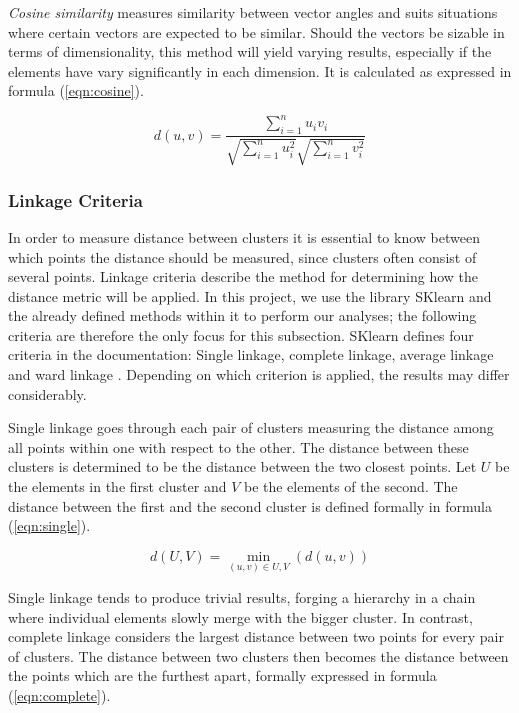 \textit{Cosine similarity} measures similarity between vector angles and suits situations where certain vectors are expected to be similar. Should the vectors be sizable in terms of dimensionality, this method will yield varying results, especially if the elements have vary significantly in each dimension. It is calculated as expressed in formula (\ref{eqn:cosine}).

\begin{equation}
\label{eqn:cosine}
d(u, v) = \frac{\sum_{i=1}^n u_iv_i}{\sqrt{\sum_{i=1}^n u_i^2}\sqrt{\sum_{i=1}^n v_i^2}}
\end{equation}

\subsubsection{Linkage Criteria}
In order to measure distance between clusters it is essential to know between which points the distance should be measured, since clusters often consist of several points. Linkage criteria describe the method for determining how the distance metric will be applied. In this project, we use the library SKlearn and the already defined methods within it to perform our analyses; the following criteria are therefore the only focus for this subsection. SKlearn defines four criteria in the documentation: Single linkage, complete linkage, average linkage and ward linkage \cite{scikit}. Depending on which criterion is applied, the results may differ considerably.

Single linkage goes through each pair of clusters measuring the distance among all points within one with respect to the other. The distance between these clusters is determined to be the distance between the two closest points. Let $U$ be the elements in the first cluster and $V$ be the elements of the second. The distance between the first and the second cluster is defined formally in formula (\ref{eqn:single}).

\begin{equation}
\label{eqn:single}
d(U, V) = \min\limits_{(u, v) \in U, V}(d(u, v))
\end{equation}

Single linkage tends to produce trivial results, forging a hierarchy in a chain where individual elements slowly merge with the bigger cluster. In contrast, complete linkage considers the largest distance between two points for every pair of clusters. The distance between two clusters then becomes the distance between the points which are the furthest apart, formally expressed in formula (\ref{eqn:complete}).

